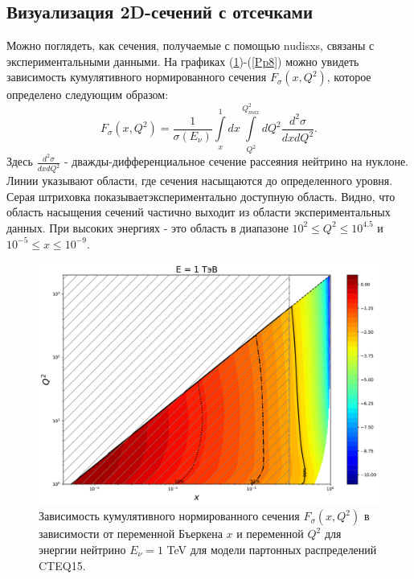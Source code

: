 \subsection{Визуализация 2D-сечений с отсечками}
Можно поглядеть, как сечения, получаемые с помощью nudisxs, связаны с экспериментальными данными. На графиках (\ref{Pp3})-(\ref{Pp8}) можно увидеть зависимость кумулятивного нормированного сечения $F_{\sigma}(x,Q^2)$, которое определено следующим образом: 
 \begin{equation}
     F_{\sigma}(x,Q^2) = \frac{1}{\sigma(E_{\nu})}\int\limits_{x}^1dx\int\limits_{Q^2}^{Q^2_{max}}dQ^2\frac{d^2\sigma}{dxdQ^2}.
 \end{equation}
 Здесь $\frac{d^2\sigma}{dxdQ^2}$ - дважды-дифференциальное сечение рассеяния нейтрино на нуклоне. Линии указывают области, где сечения насыщаются до определенного уровня. Серая штриховка показываетэкспериментально доступную область. Видно, что область насыщения сечений частично выходит из области экспериментальных данных. При высоких энергиях  - это область в диапазоне $10^2\le Q^2\le10^{4.5} $ и $10^{-5}\le x \le 10^{-9}$.  
 \begin{figure}[!h]
\centering
\includegraphics[width=0.97\linewidth]{images/NuProp/cdfxq2_cc_proton_CT18ZNNLO_14_1000.pdf}
\caption{Зависимость кумулятивного нормированного сечения $F_{\sigma}(x,Q^2)$ в зависимости от переменной Бъеркена $x$ и переменной $Q^2$ для энергии нейтрино $E_{\nu} = 1$ TeV для модели партонных распределений CTEQ15\cite{ncteq15}. }
\label{Pp3}
\end{figure}
